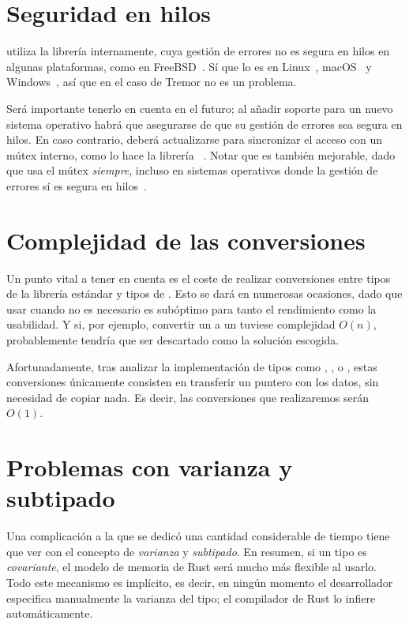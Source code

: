\section{Seguridad en hilos}

\abistable utiliza la librería  internamente, cuya gestión
de errores no es segura en hilos en algunas plataformas, como  en
FreeBSD~\cite{hardplugins3}\cite{thsafe_openbsd}. Sí que lo es en
Linux~\cite{thsafe_linux}, macOS~\cite{thsafe_macos} y Windows~\cite{thsafe_ms},
así que en el caso de Tremor no es un problema.

Será importante tenerlo en cuenta en el futuro; al añadir soporte para un nuevo
sistema operativo habrá que asegurarse de que su gestión de errores sea segura
en hilos. En caso contrario, deberá actualizarse  para
sincronizar el acceso con un mútex interno, como lo hace la librería
~\cite{thsafe_dlopen}. Notar que  es también
mejorable, dado que usa el mútex \emph{siempre}, incluso en sistemas operativos
donde la gestión de errores sí es segura en hilos~\cite{thsafe_dlopen_issue}.

\section{Complejidad de las conversiones}\label{abiperf}

Un punto vital a tener en cuenta es el coste de realizar conversiones entre
tipos de la librería estándar y tipos de \abistable. Esto se dará en numerosas
ocasiones, dado que usar \abistable cuando no es necesario es subóptimo para
tanto el rendimiento como la usabilidad. Y si, por ejemplo, convertir un
 a un  tuviese complejidad $O(n)$, probablemente
\abistable tendría que ser descartado como la solución escogida.

Afortunadamente, tras analizar la implementación de tipos como ,
,  o , estas conversiones únicamente
consisten en transferir un puntero con los datos, sin necesidad de copiar nada.
Es decir, las conversiones que realizaremos serán $O(1)$.

\section{Problemas con varianza y subtipado}

Una complicación a la que se dedicó una cantidad considerable de tiempo tiene
que ver con el concepto de \emph{varianza} y \emph{subtipado}. En resumen, si un
tipo es \emph{covariante}, el modelo de memoria de Rust será mucho más flexible
al usarlo. Todo este mecanismo es implícito, es decir, en ningún momento el
desarrollador especifica manualmente la varianza del tipo; el compilador de Rust
lo infiere automáticamente.

